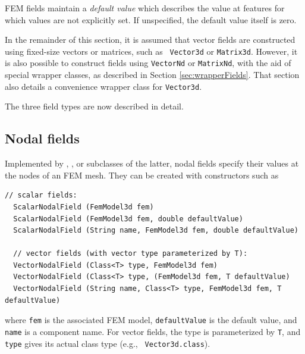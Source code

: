 FEM fields maintain a {\it default value} which describes the value at
features for which values are not explicitly set. If unspecified,
the default value itself is zero.

In the remainder of this section, it is assumed that vector fields are
constructed using fixed-size vectors or matrices, such as {\tt
Vector3d} or {\tt Matrix3d}.  However, it is also possible to
construct fields using {\tt VectorNd} or {\tt MatrixNd}, with the aid
of special wrapper classes, as described in Section
\ref{sec:wrapperFields}. That section also details a convenience
wrapper class for {\tt Vector3d}.

The three field types are now described in detail.

\subsection{Nodal fields}

Implemented by
,
, 
or subclasses
of the latter, nodal fields specify their values at the nodes of an
FEM mesh. They can be created with constructors such as
%
\begin{lstlisting}[]
  // scalar fields:
  ScalarNodalField (FemModel3d fem)
  ScalarNodalField (FemModel3d fem, double defaultValue)
  ScalarNodalField (String name, FemModel3d fem, double defaultValue)

  // vector fields (with vector type parameterized by T):
  VectorNodalField (Class<T> type, FemModel3d fem)
  VectorNodalField (Class<T> type, (FemModel3d fem, T defaultValue)
  VectorNodalField (String name, Class<T> type, FemModel3d fem, T defaultValue)
\end{lstlisting}
%
where {\tt fem} is the associated FEM model, {\tt defaultValue} is the
default value, and {\tt name} is a component name. For vector fields,
the  type is parameterized by
{\tt T}, and {\tt type} gives its actual class type (e.g., {\tt
Vector3d.class}).

